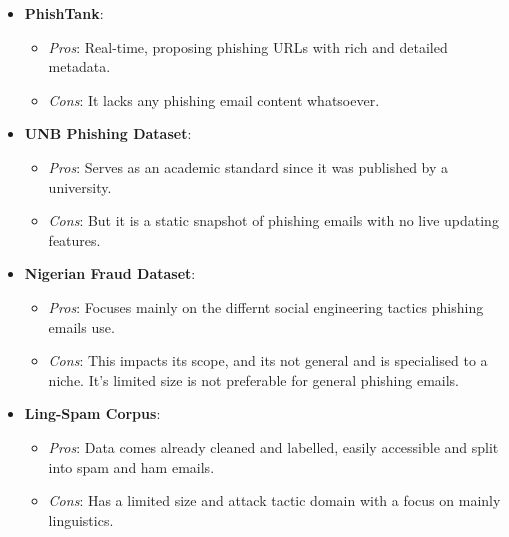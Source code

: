 \begin{itemize}
\begin{itemize}
  \end{itemize}
  \item \textbf{PhishTank}:
  \begin{itemize}
    \item \textit{Pros}: Real-time, proposing phishing URLs with rich and detailed metadata.
    \item \textit{Cons}: It lacks any phishing email content whatsoever.
  \end{itemize}
  \item \textbf{UNB Phishing Dataset}:
  \begin{itemize}
    \item \textit{Pros}: Serves as an academic standard since it was published by a university.
    \item \textit{Cons}: But it is a static snapshot of phishing emails with no live updating features.
  \end{itemize}
  \item \textbf{Nigerian Fraud Dataset}:
  \begin{itemize}
    \item \textit{Pros}: Focuses mainly on the differnt social engineering tactics phishing emails use.
    \item \textit{Cons}: This impacts its scope, and its not general and is specialised to a niche. It's limited size is not preferable for general phishing emails.
  \end{itemize}
  \item \textbf{Ling-Spam Corpus}:
  \begin{itemize}
    \item \textit{Pros}: Data comes already cleaned and labelled, easily accessible and split into spam and ham emails.
    \item \textit{Cons}: Has a limited size and attack tactic domain with a focus on mainly linguistics.
  \end{itemize}
\end{itemize}

